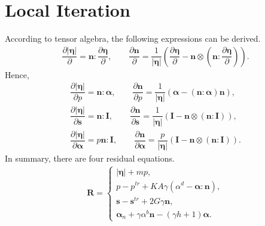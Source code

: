 \documentclass[11pt,fleqn,3p]{elsarticle}
\newcommand*{\pfrac}[2]{\dfrac{\partial#1}{\partial#2}}
\begin{document}
\section{Local Iteration}
According to tensor algebra, the following expressions can be derived.
\begin{gather*}
\pfrac{|\mathbold{\eta}|}{}=\mathbold{n}:\pfrac{\mathbold{\eta}}{},\qquad
\pfrac{\mathbold{n}}{}=\dfrac{1}{|\mathbold{\eta}|}\left(\pfrac{\mathbold{\eta}}{}-\mathbold{n}\otimes\left(\mathbold{n}:\pfrac{\mathbold{\eta}}{}\right)\right).
\end{gather*}
Hence,
\begin{gather*}
\pfrac{|\mathbold{\eta}|}{p}=\mathbold{n}:\mathbold{\alpha},\qquad
\pfrac{\mathbold{n}}{p}=\dfrac{1}{|\mathbold{\eta}|}\left(\mathbold{\alpha}-\left(\mathbold{n}:\mathbold{\alpha}\right)\mathbold{n}\right),\\
\pfrac{|\mathbold{\eta}|}{\mathbold{s}}=\mathbold{n}:\mathbf{I},\qquad
\pfrac{\mathbold{n}}{\mathbold{s}}=\dfrac{1}{|\mathbold{\eta}|}\left(\mathbf{I}-\mathbold{n}\otimes\left(\mathbold{n}:\mathbf{I}\right)\right),\\
\pfrac{|\mathbold{\eta}|}{\mathbold{\alpha}}=p\mathbold{n}:\mathbf{I},\qquad
\pfrac{\mathbold{n}}{\mathbold{\alpha}}=\dfrac{p}{|\mathbold{\eta}|}\left(\mathbf{I}-\mathbold{n}\otimes\left(\mathbold{n}:\mathbf{I}\right)\right).
\end{gather*}
In summary, there are four residual equations.
\begin{gather*}
\mathbold{R}=\left\{\begin{array}{l}
|\mathbold{\eta}|+mp,\\[3mm]
p-p^{tr}+KA\gamma\left(\alpha^d-\mathbold{\alpha}:\mathbold{n}\right),\\[3mm]
\mathbold{s}-\mathbold{s}^{tr}+2G\gamma\mathbold{n},\\[3mm]
\mathbold{\alpha}_n+\gamma{}\alpha^b\mathbold{n}-\left(\gamma{}h+1\right)\mathbold{\alpha}.
\end{array}\right.
\end{gather*}
\end{document}
